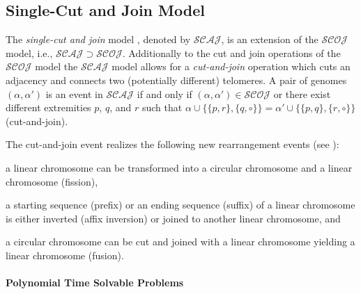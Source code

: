 \documentclass{svmult}
\newcommand{\m}[1]{\mathcal{#1}}
\begin{document}
\subsection{Single-Cut and Join Model}
\label{sec:scaj}

The \emph{single-cut and join} model \cite{Bergeron_2010}, denoted by $\m{SCAJ}$, is an extension of the $\m{SCOJ}$ model, i.e., 
$\m{SCAJ}\supset\m{SCOJ}$.
%
Additionally to the cut and join operations of the $\m{SCOJ}$ model 
the $\m{SCAJ}$ model allows for a \emph{cut-and-join} operation which 
cuts an adjacency and connects two (potentially different) telomeres.
%
A pair of genomes $(\alpha,\alpha')$ is an event in
$\m{SCAJ}$ if and only if $(\alpha,\alpha')\in \m{SCOJ}$ or there exist
different extremities $p$, $q$, and $r$ such that
$\alpha\cup\{\{p,r\},\{q,\circ\}\}=\alpha'\cup\{\{p,q\},\{r,\circ\}\}$
(cut-and-join).
%

The cut-and-join event realizes the following new rearrangement events (see ): 
\begin{inparaenum}[i)]
\item a linear chromosome can be transformed into a circular chromosome and a linear chromosome (fission), 
\item a starting sequence (prefix) or an ending
sequence (suffix) of a linear chromosome is either inverted (affix inversion) or
joined to another linear chromosome, and
\item a circular chromosome can be cut and joined with a linear chromosome yielding a linear chromosome (fusion).
\end{inparaenum}

\paragraph{Polynomial Time Solvable Problems}
\end{document}
